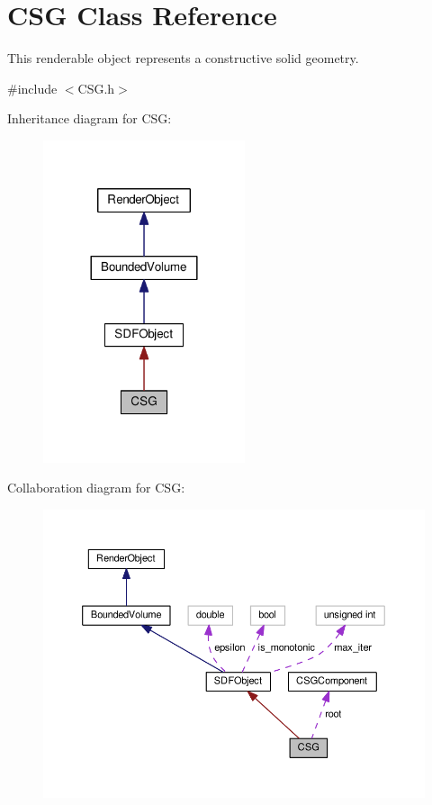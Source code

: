\hypertarget{classCSG}{}\section{C\+SG Class Reference}
\label{classCSG}


This renderable object represents a constructive solid geometry.  




{\ttfamily \#include $<$C\+S\+G.\+h$>$}



Inheritance diagram for C\+SG\+:
\nopagebreak
\begin{figure}[H]
\begin{center}
\leavevmode
\includegraphics[width=168pt]{classCSG__inherit__graph}
\end{center}
\end{figure}


Collaboration diagram for C\+SG\+:
\nopagebreak
\begin{figure}[H]
\begin{center}
\leavevmode
\includegraphics[width=350pt]{classCSG__coll__graph}
\end{center}
\end{figure}
